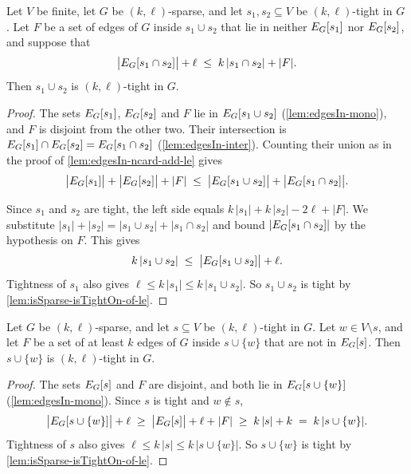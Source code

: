 \begin{theorem}
  \label{thm:isTightOn-union-with-bonus}
  \leanok
  Let $V$ be finite, let $G$ be $(k,\ell)$-sparse, and let
  $s_1, s_2 \subseteq V$ be $(k,\ell)$-tight in $G$. Let $F$ be a set of
  edges of $G$ inside $s_1 \cup s_2$ that lie in neither
  $E_{G}[s_1]$ nor $E_{G}[s_2]$, and suppose that
  \[
    \bigl|E_{G}[s_1 \cap s_2]\bigr| + \ell
    \;\le\; k\,|s_1 \cap s_2| + |F|.
  \]
  Then $s_1 \cup s_2$ is $(k,\ell)$-tight in $G$.
\end{theorem}
\begin{proof}
  \leanok
  The sets $E_{G}[s_1]$, $E_{G}[s_2]$ and $F$ lie in
  $E_{G}[s_1 \cup s_2]$ (\cref{lem:edgesIn-mono}), and $F$ is
  disjoint from the other two. Their intersection is
  $E_{G}[s_1] \cap E_{G}[s_2] = E_{G}[s_1 \cap s_2]$
  (\cref{lem:edgesIn-inter}). Counting their union as in the proof of
  \cref{lem:edgesIn-ncard-add-le} gives
  \[
    \bigl|E_{G}[s_1]\bigr| + \bigl|E_{G}[s_2]\bigr| + |F|
    \;\le\;
    \bigl|E_{G}[s_1 \cup s_2]\bigr|
      + \bigl|E_{G}[s_1 \cap s_2]\bigr|.
  \]

  Since $s_1$ and $s_2$ are tight, the left side equals
  $k\,|s_1| + k\,|s_2| - 2\ell + |F|$. We substitute
  $|s_1| + |s_2| = |s_1 \cup s_2| + |s_1 \cap s_2|$ and bound
  $|E_{G}[s_1 \cap s_2]|$ by the hypothesis on $F$. This gives
  \[
    k\,|s_1 \cup s_2| \;\le\; \bigl|E_{G}[s_1 \cup s_2]\bigr| + \ell.
  \]
  Tightness of $s_1$ also gives $\ell \le k\,|s_1| \le k\,|s_1 \cup s_2|$.
  So $s_1 \cup s_2$ is tight by \cref{lem:isSparse-isTightOn-of-le}.
\end{proof}

\begin{theorem}
  \label{thm:isTightOn-insert-vertex-with-edges}
  \leanok
  Let $G$ be $(k,\ell)$-sparse, and let $s \subseteq V$ be
  $(k,\ell)$-tight in $G$. Let $w \in V \setminus s$,
  and let $F$ be a set of at least $k$ edges of $G$ inside
  $s \cup \{w\}$ that are not in $E_{G}[s]$. Then $s \cup \{w\}$ is
  $(k,\ell)$-tight in $G$.
\end{theorem}
\begin{proof}
  \leanok
  The sets $E_{G}[s]$ and $F$ are disjoint, and both lie in
  $E_{G}[s \cup \{w\}]$ (\cref{lem:edgesIn-mono}). Since $s$ is tight
  and $w \notin s$,
  \[
    \bigl|E_{G}[s \cup \{w\}]\bigr| + \ell
    \;\ge\; \bigl|E_{G}[s]\bigr| + \ell + |F|
    \;\ge\; k\,|s| + k \;=\; k\,|s \cup \{w\}|.
  \]
  Tightness of $s$ also gives $\ell \le k\,|s| \le k\,|s \cup \{w\}|$.
  So $s \cup \{w\}$ is tight by \cref{lem:isSparse-isTightOn-of-le}.
\end{proof}

